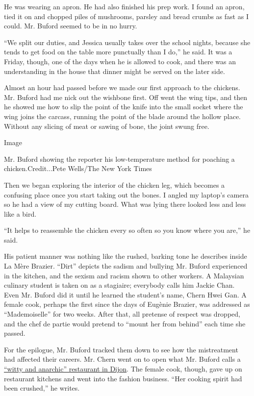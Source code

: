 He was wearing an apron. He had also finished his prep work. I found an
apron, tied it on and chopped piles of mushrooms, parsley and bread
crumbs as fast as I could. Mr. Buford seemed to be in no hurry.

``We split our duties, and Jessica usually takes over the school nights,
because she tends to get food on the table more punctually than I do,''
he said. It was a Friday, though, one of the days when he is allowed to
cook, and there was an understanding in the house that dinner might be
served on the later side.

Almost an hour had passed before we made our first approach to the
chickens. Mr. Buford had me nick out the wishbone first. Off went the
wing tips, and then he showed me how to slip the point of the knife into
the small socket where the wing joins the carcass, running the point of
the blade around the hollow place. Without any slicing of meat or sawing
of bone, the joint swung free.

Image

Mr. Buford showing the reporter his low-temperature method for poaching
a chicken.Credit...Pete Wells/The New York Times

Then we began exploring the interior of the chicken leg, which becomes a
confusing place once you start taking out the bones. I angled my
laptop's camera so he had a view of my cutting board. What was lying
there looked less and less like a bird.

``It helps to reassemble the chicken every so often so you know where
you are,'' he said.

His patient manner was nothing like the rushed, barking tone he
describes inside La Mère Brazier. ``Dirt'' depicts the sadism and
bullying Mr. Buford experienced in the kitchen, and the sexism and
racism shown to other workers. A Malaysian culinary student is taken on
as a stagiaire; everybody calls him Jackie Chan. Even Mr. Buford did it
until he learned the student's name, Chern Hwei Gan. A female cook,
perhaps the first since the days of Eugènie Brazier, was addressed as
``Mademoiselle'' for two weeks. After that, all pretense of respect was
dropped, and the chef de partie would pretend to ``mount her from
behind'' each time she passed.

For the epilogue, Mr. Buford tracked them down to see how the
mistreatment had affected their careers. Mr. Chern went on to open what
Mr. Buford calls a \href{https://www.parapluie-dijon.com/}{``witty and
anarchic'' restaurant in Dijon}. The female cook, though, gave up on
restaurant kitchens and went into the fashion business. ``Her cooking
spirit had been crushed,'' he writes.

